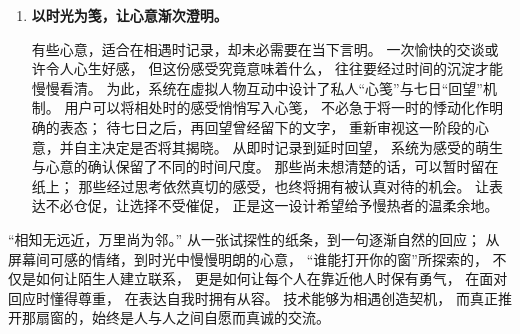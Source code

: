 \begin{enumerate}
    \item \textbf{以时光为笺，让心意渐次澄明。}

    有些心意，适合在相遇时记录，却未必需要在当下言明。
    一次愉快的交谈或许令人心生好感，
    但这份感受究竟意味着什么，
    往往要经过时间的沉淀才能慢慢看清。
    为此，系统在虚拟人物互动中设计了私人“心笺”与七日“回望”机制。
    用户可以将相处时的感受悄悄写入心笺，
    不必急于将一时的悸动化作明确的表态；
    待七日之后，再回望曾经留下的文字，
    重新审视这一阶段的心意，并自主决定是否将其揭晓。
    从即时记录到延时回望，
    系统为感受的萌生与心意的确认保留了不同的时间尺度。
    那些尚未想清楚的话，可以暂时留在纸上；
    那些经过思考依然真切的感受，也终将拥有被认真对待的机会。
    让表达不必仓促，让选择不受催促，
    正是这一设计希望给予慢热者的温柔余地。
\end{enumerate}

“相知无远近，万里尚为邻。”
从一张试探性的纸条，到一句逐渐自然的回应；
从屏幕间可感的情绪，到时光中慢慢明朗的心意，
“谁能打开你的窗”所探索的，
不仅是如何让陌生人建立联系，
更是如何让每个人在靠近他人时保有勇气，
在面对回应时懂得尊重，
在表达自我时拥有从容。
技术能够为相遇创造契机，
而真正推开那扇窗的，始终是人与人之间自愿而真诚的交流。

